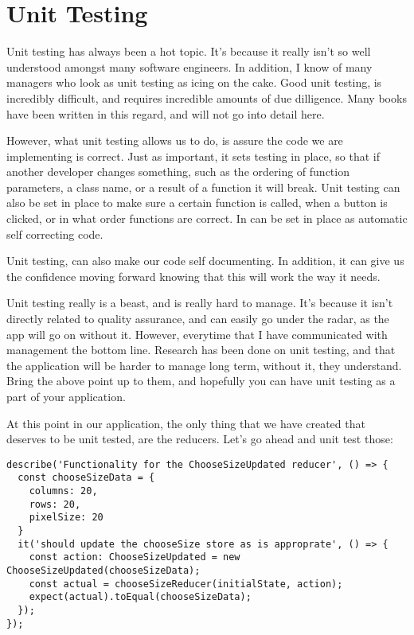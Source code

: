 
\section{ Unit Testing }

Unit testing has always been a hot topic. It's because it really isn't so well
understood amongst many software engineers. In addition, I know of many managers
who look as unit testing as icing on the cake. Good unit testing, is incredibly
difficult, and requires incredible amounts of due dilligence. Many books have
been written in this regard, and will not go into detail here.

However, what unit testing allows us to do, is assure the code we are
implementing is correct. Just as important, it sets testing in place, so that if
another developer changes something, such as the ordering of function
parameters, a class name, or a result of a function it will break. Unit testing
can also be set in place to make sure a certain function is called, when a
button is clicked, or in what order functions are correct. In can be set in
place as automatic self correcting code.

Unit testing, can also make our code self documenting. In addition, it can
give us the confidence moving forward knowing that this will work the way it
needs.

Unit testing really is a beast, and is really hard to manage. It's because it
isn't directly related to quality assurance, and can easily go under the radar,
as the app will go on without it. However, everytime that I have communicated
with management the bottom line. Research has been done on unit testing, and that
the application will be harder to manage long term, without it, they understand.
Bring the above point up to them, and hopefully you can have unit testing as a
part of your application.

At this point in our application, the only thing that we have created that
deserves to be unit tested, are the reducers. Let's go ahead and unit test those:

\begin{lstlisting}
describe('Functionality for the ChooseSizeUpdated reducer', () => {
  const chooseSizeData = {
    columns: 20,
    rows: 20,
    pixelSize: 20
  }
  it('should update the chooseSize store as is approprate', () => {
    const action: ChooseSizeUpdated = new ChooseSizeUpdated(chooseSizeData);
    const actual = chooseSizeReducer(initialState, action);
    expect(actual).toEqual(chooseSizeData);
  });
});
\end{lstlisting}

